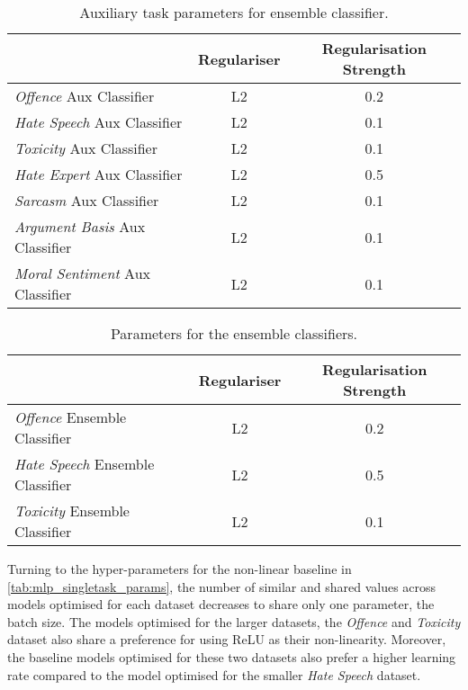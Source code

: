 \begin{table}[h]
  \centering
  \begin{tabular}{l|cc}
                                            & Regulariser & Regularisation Strength \\\hline
    \textit{Offence} Aux Classifier         & L2          & 0.2                     \\
    \textit{Hate Speech} Aux Classifier     & L2          & 0.1                     \\
    \textit{Toxicity} Aux Classifier        & L2          & 0.1                     \\
    \textit{Hate Expert} Aux Classifier     & L2          & 0.5                     \\
    \textit{Sarcasm} Aux Classifier         & L2          & 0.1                     \\
    \textit{Argument Basis} Aux Classifier  & L2          & 0.1                     \\
    \textit{Moral Sentiment} Aux Classifier & L2          & 0.1
  \end{tabular}
  \caption{Auxiliary task parameters for ensemble classifier.}
  \label{tab:ensemble_aux_params}
\end{table}

\begin{table}[h]
  \centering
  \begin{tabular}{l|cc}
                                             & Regulariser & Regularisation Strength \\\hline
    \textit{Offence} Ensemble Classifier     & L2          & 0.2                     \\
    \textit{Hate Speech} Ensemble Classifier & L2          & 0.5                     \\
    \textit{Toxicity} Ensemble Classifier    & L2          & 0.1
  \end{tabular}
  \caption{Parameters for the ensemble classifiers.}
  \label{tab:ensemble_params}
\end{table}

Turning to the hyper-parameters for the non-linear baseline in \cref{tab:mlp_singletask_params}, the number of similar and shared values across models optimised for each dataset decreases to share only one parameter, the batch size.
The models optimised for the larger datasets, the \textit{Offence} and \textit{Toxicity} dataset also share a preference for using ReLU as their non-linearity.
Moreover, the baseline models optimised for these two datasets also prefer a higher learning rate compared to the model optimised for the smaller \textit{Hate Speech} dataset.

